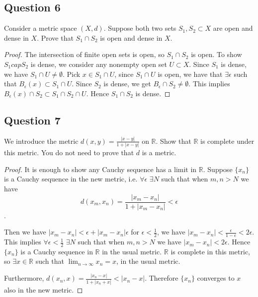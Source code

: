 \documentclass{tufte-book}
\theoremstyle{mytheoremstyle}
\theoremstyle{mylemstyle}
\theoremstyle{mydefstyle}
\begin{document}
\subsection{Question 6}
Consider a metric space $(X,d)$.  Suppose both two sets $S_1, S_2 \subset X$ are open and dense in $X$.  Prove that $S_1 \cap S_2$ is open and dense in $X$.

\begin{proof}
The intersection of finite open sets is open, so $S_1 \cap S_2$ is open.  To show $S_1 cap S_2$ is dense, we consider any nonempty open set $U \subset X$.  Since $S_1$ is dense, we have $S_1 \cap U \neq \emptyset$.  Pick $x \in S_1 \cap U$, since $S_1 \cap U$ is open, we have that $\exists \epsilon$ such that $B_\epsilon(x) \subset S_1 \cap U$.  Since $S_2$ is dense, we get $B_\epsilon \cap S_2 \neq \emptyset$.  This implies $B_\epsilon(x) \cap S_2 \subset S_1 \cap S_2 \cap U$.  Hence $S_1 \cap S_2$ is dense.
\end{proof}

\subsection{Question 7}
We introduce the metric $d(x,y) = \frac{|x-y|}{1+ |x-y|}$ on $\mathbb{R}$.  Show that $\mathbb{R}$ is complete under this metric.  You do not need to prove that $d$ is a metric.

\begin{proof}

It is enough to show any Cauchy sequence has a limit in $\mathbb{R}$.  Suppose $\{x_n\}$ is a Cauchy sequence in the new metric, i.e. $\forall \epsilon$ $\exists N$ such that when $m,n > N$ we have
\[ d(x_m, x_n) = \frac{|x_m - x_n|}{1+|x_m-x_n|} < \epsilon \].

Then we have $|x_m - x_n| < \epsilon + |x_m-x_n|\epsilon$ for $\epsilon < \frac{1}{2}$, we have $|x_m-x_n| < \frac{\epsilon}{1-\epsilon} < 2\epsilon$.   This implies $\forall \epsilon < \frac{1}{2}$ $\exists N$ such that when $m, n > N$ we have $|x_m - x_n| < 2\epsilon$.  Hence $\{x_n\}$ is a Cauchy sequence in $\mathbb{R}$ in the usual metric. $\mathbb{R}$ is complete in this metric, so $\exists x \in \mathbb{R}$ such that $\lim_{n \to \infty}x_n = x$, in the usual metric.

Furthermore, $d(x_n, x) = \frac{|x_n -x|}{1+|x_n+x|} < |x_n-x|$.  Therefore $\{x_n\}$ converges to $x$ also in the new metric.

\end{proof}
\end{document}
